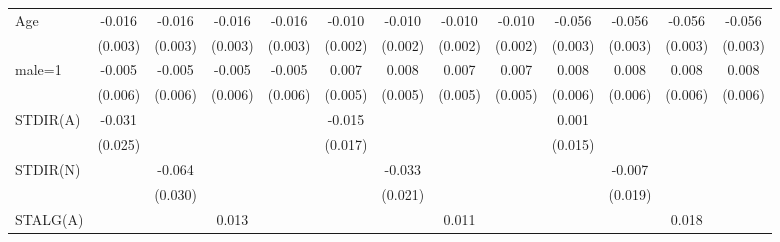 {\begin{tabular*}{\linewidth}{l@{\extracolsep{\fill}}*{12}{c}}
\addlinespace
Age             &   -0.016\sym{***}&   -0.016\sym{***}&   -0.016\sym{***}&   -0.016\sym{***}&   -0.010\sym{***}&   -0.010\sym{***}&   -0.010\sym{***}&   -0.010\sym{***}&   -0.056\sym{***}&   -0.056\sym{***}&   -0.056\sym{***}&   -0.056\sym{***}\\
                &  (0.003)         &  (0.003)         &  (0.003)         &  (0.003)         &  (0.002)         &  (0.002)         &  (0.002)         &  (0.002)         &  (0.003)         &  (0.003)         &  (0.003)         &  (0.003)         \\
\addlinespace
male=1          &   -0.005         &   -0.005         &   -0.005         &   -0.005         &    0.007         &    0.008         &    0.007         &    0.007         &    0.008         &    0.008         &    0.008         &    0.008         \\
                &  (0.006)         &  (0.006)         &  (0.006)         &  (0.006)         &  (0.005)         &  (0.005)         &  (0.005)         &  (0.005)         &  (0.006)         &  (0.006)         &  (0.006)         &  (0.006)         \\
\addlinespace
STDIR(A)        &   -0.031         &                  &                  &                  &   -0.015         &                  &                  &                  &    0.001         &                  &                  &                  \\
                &  (0.025)         &                  &                  &                  &  (0.017)         &                  &                  &                  &  (0.015)         &                  &                  &                  \\
\addlinespace
STDIR(N)        &                  &   -0.064\sym{**} &                  &                  &                  &   -0.033         &                  &                  &                  &   -0.007         &                  &                  \\
                &                  &  (0.030)         &                  &                  &                  &  (0.021)         &                  &                  &                  &  (0.019)         &                  &                  \\
\addlinespace
STALG(A)        &                  &                  &    0.013\sym{**} &                  &                  &                  &    0.011\sym{**} &                  &                  &                  &    0.018\sym{***}&                  \\

\end{tabular*}}
